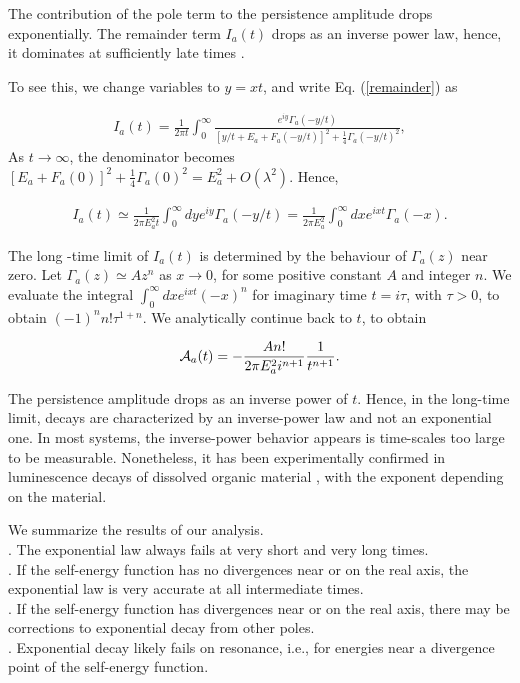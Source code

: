 \documentclass[12pt]{article}
\numberwithin{equation}{section}
\begin{document}
\medskip

  The contribution of the pole term to the persistence amplitude drops exponentially.  The remainder term $I_a(t)$ drops as an inverse power law, hence, it dominates at sufficiently late times \cite{Helund, Nami2}.

To see this, we change  variables to $y = x t$, and write Eq. (\ref{remainder}) as

\begin{eqnarray}
I_a(t) = \frac{1}{2\pi t}\int_0^{\infty} \frac{e^{iy} \Gamma_a(-y/t)}{[y/t + E_a +F_a(-y/t)]^2 + \frac{1}{4}\Gamma_a(-y/t)^2  }, \label{eqyb}
\end{eqnarray}
 As $t \rightarrow \infty $, the denominator becomes $[E_a+F_a(0)]^2 + \frac{1}{4}\Gamma_a(0)^2 = E_a^2 +O(\lambda^2)$.
  Hence,

\begin{eqnarray}
I_a(t) \simeq    \frac{1}{2\pi E_a^2 t} \int_0^\infty dy e^{i y} \Gamma_a(-y/t) =  \frac{1 }{2\pi E_a^2  }  \int_0^\infty dx e^{i xt} \Gamma_a(-x). \label{iat3}
\end{eqnarray}


The long -time limit of $I_a(t)  $ is determined by  the behaviour of $\Gamma_a(z)$ near zero.
  Let $\Gamma_a(z) \simeq A z^{n}$ as $x \rightarrow 0$, for some positive constant $A$ and integer $n$. We evaluate the integral $\int_0^\infty dx e^{i xt} (-x)^n$ for imaginary time $t = i \tau$, with $\tau >0$, to obtain $(-1)^n n!\tau^{1+n}$. We analytically continue back to $t$, to obtain

\begin{eqnarray}
{\cal A}_a(t)=  - \frac{A n! }{2\pi E_a^2 i^{n+1} } \frac{1}{t^{n+1}}. \label{iat0}
\end{eqnarray}


The persistence amplitude  drops as an inverse power of   $t$. Hence, in the long-time limit, decays are characterized by an inverse-power law and not an exponential one. In most systems, the inverse-power behavior appears is time-scales too large to be measurable. Nonetheless, it has been experimentally confirmed in luminescence decays of dissolved organic
material \cite{longtime}, with the exponent depending on the material.


\bigskip

\noindent We summarize the results of our analysis.
\\
. The exponential law always fails at very short and very long times.
\\
. If the self-energy function has no divergences near or on the real axis,  the exponential law is very accurate at all intermediate times.
\\
. If the self-energy function has divergences near or on the real axis,  there may be corrections to exponential decay from other poles.
\\
. Exponential decay likely fails on resonance, i.e., for energies near a divergence point of the self-energy function.
\end{document}
